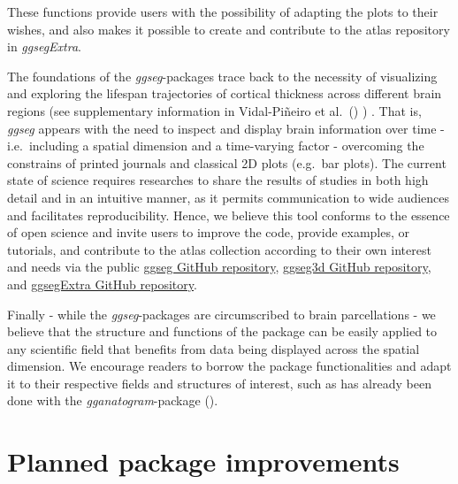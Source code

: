 \documentclass[fleqn,10pt]{wlpeerj} %
\begin{document}
These functions provide users with the possibility of adapting the plots to their wishes, and also makes it possible to create and contribute to the atlas repository in \emph{ggsegExtra}.

The foundations of the \emph{ggseg}-packages trace back to the necessity of visualizing and exploring the lifespan trajectories of cortical thickness across different brain regions (see supplementary information in Vidal-Piñeiro et al.~(\citeyearpar{vidal_2019}) ) .
That is, \emph{ggseg} appears with the need to inspect and display brain information over time - i.e.~including a spatial dimension and a time-varying factor - overcoming the constrains of printed journals and classical 2D plots (e.g.~bar plots).
The current state of science requires researches to share the results of studies in both high detail and in an intuitive manner, as it permits communication to wide audiences and facilitates reproducibility.
Hence, we believe this tool conforms to the essence of open science and invite users to improve the code, provide examples, or tutorials, and contribute to the atlas collection according to their own interest and needs via the public \href{https://github.com/LCBC-UiO/ggseg}{ggseg GitHub repository}, \href{https://github.com/LCBC-UiO/ggseg3d}{ggseg3d GitHub repository}, and \href{https://github.com/LCBC-UiO/ggsegExtra}{ggsegExtra GitHub repository}.

Finally - while the \emph{ggseg}-packages are circumscribed to brain parcellations - we believe that the structure and functions of the package can be easily applied to any scientific field that benefits from data being displayed across the spatial dimension.
We encourage readers to borrow the package functionalities and adapt it to their respective fields and structures of interest, such as has already been done with the \emph{gganatogram}-package (\citet{gganatogram}).

\hypertarget{planned-package-improvements}{%
\section{Planned package improvements}\label{planned-package-improvements}}
\end{document}
